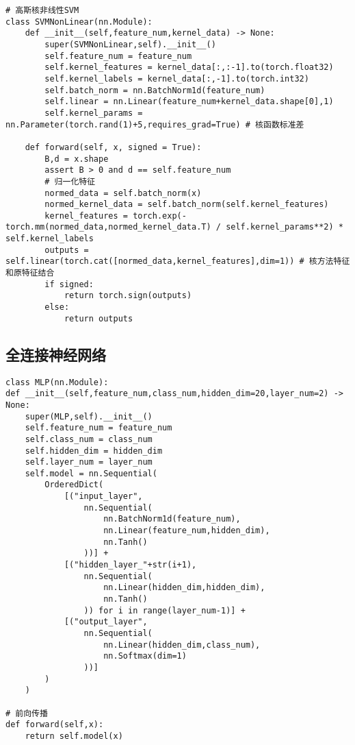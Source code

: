 \begin{lstlisting}[caption={非线性支持向量机}]
# 高斯核非线性SVM
class SVMNonLinear(nn.Module):
    def __init__(self,feature_num,kernel_data) -> None:
        super(SVMNonLinear,self).__init__()
        self.feature_num = feature_num
        self.kernel_features = kernel_data[:,:-1].to(torch.float32)
        self.kernel_labels = kernel_data[:,-1].to(torch.int32)
        self.batch_norm = nn.BatchNorm1d(feature_num)
        self.linear = nn.Linear(feature_num+kernel_data.shape[0],1)
        self.kernel_params = nn.Parameter(torch.rand(1)+5,requires_grad=True) # 核函数标准差
    
    def forward(self, x, signed = True):
        B,d = x.shape
        assert B > 0 and d == self.feature_num
        # 归一化特征
        normed_data = self.batch_norm(x)
        normed_kernel_data = self.batch_norm(self.kernel_features)
        kernel_features = torch.exp(-torch.mm(normed_data,normed_kernel_data.T) / self.kernel_params**2) * self.kernel_labels
        outputs = self.linear(torch.cat([normed_data,kernel_features],dim=1)) # 核方法特征和原特征结合
        if signed:
            return torch.sign(outputs)
        else:
            return outputs
\end{lstlisting}

\subsection{全连接神经网络}
\begin{lstlisting}[caption={全连接神经网络模型实现}]
class MLP(nn.Module):
def __init__(self,feature_num,class_num,hidden_dim=20,layer_num=2) -> None:
    super(MLP,self).__init__()
    self.feature_num = feature_num
    self.class_num = class_num
    self.hidden_dim = hidden_dim
    self.layer_num = layer_num
    self.model = nn.Sequential(
        OrderedDict(
            [("input_layer",
                nn.Sequential(
                    nn.BatchNorm1d(feature_num),
                    nn.Linear(feature_num,hidden_dim),
                    nn.Tanh()
                ))] + 
            [("hidden_layer_"+str(i+1),
                nn.Sequential(
                    nn.Linear(hidden_dim,hidden_dim),
                    nn.Tanh()
                )) for i in range(layer_num-1)] + 
            [("output_layer",
                nn.Sequential(
                    nn.Linear(hidden_dim,class_num),
                    nn.Softmax(dim=1)
                ))]
        )
    )

# 前向传播
def forward(self,x):
    return self.model(x)
\end{lstlisting}


